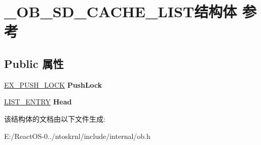 \hypertarget{struct___o_b___s_d___c_a_c_h_e___l_i_s_t}{}\section{\+\_\+\+O\+B\+\_\+\+S\+D\+\_\+\+C\+A\+C\+H\+E\+\_\+\+L\+I\+S\+T结构体 参考}
\label{struct___o_b___s_d___c_a_c_h_e___l_i_s_t}
\subsection*{Public 属性}
\begin{DoxyCompactItemize}
\item 
\mbox{\label{struct___o_b___s_d___c_a_c_h_e___l_i_s_t_a04915d9252c64a323eebf0fb516e7bd2}} 
\hyperlink{struct___e_x___p_u_s_h___l_o_c_k}{E\+X\+\_\+\+P\+U\+S\+H\+\_\+\+L\+O\+CK} {\bfseries Push\+Lock}
\item 
\mbox{\label{struct___o_b___s_d___c_a_c_h_e___l_i_s_t_ad4bb8d5befc8d1cbd08d7c7b760642dc}} 
\hyperlink{struct___l_i_s_t___e_n_t_r_y}{L\+I\+S\+T\+\_\+\+E\+N\+T\+RY} {\bfseries Head}
\end{DoxyCompactItemize}


该结构体的文档由以下文件生成\+:\begin{DoxyCompactItemize}
\item 
E\+:/\+React\+O\+S-\/0../ntoskrnl/include/internal/ob.\+h\end{DoxyCompactItemize}
